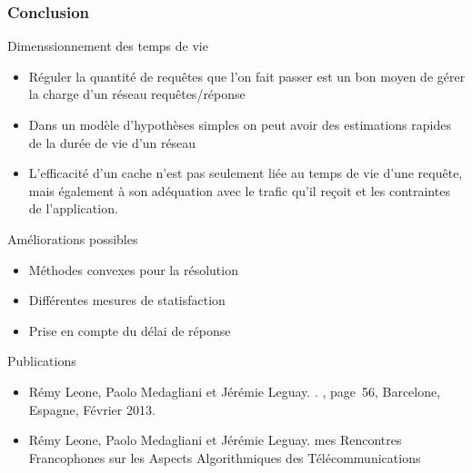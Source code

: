 \begin{frame}\frametitle{Conclusion}

  \begin{alertblock}{Dimenssionnement des temps de vie}

    \begin{itemize}

      \item Réguler la quantité de requêtes que l'on fait passer est un bon moyen de gérer la charge d'un réseau requêtes/réponse

      \item Dans un modèle d'hypothèses simples on peut avoir des estimations rapides de la durée de vie d'un réseau

      \item L'efficacité d'un cache n'est pas seulement liée au temps de vie d'une requête, mais également à son adéquation avec le trafic qu'il reçoit et les contraintes de l'application.

    \end{itemize}

  \end{alertblock}

  \begin{block}{Améliorations possibles}
    \begin{itemize}
      \item Méthodes convexes pour la résolution
      \item Différentes mesures de statisfaction
      \item Prise en compte du délai de réponse
    \end{itemize}
  \end{block}

\end{frame}

\begin{frame}{Publications}
  \begin{itemize}
    \item Rémy Leone, Paolo Medagliani et Jérémie Leguay.
      .
      , page~56, Barcelone, Espagne, Février 2013.

    \item Rémy Leone, Paolo Medagliani et Jérémie Leguay.
      mes Rencontres Francophones sur les Aspects Algorithmiques des T{\'e}l{\'e}communications

  \end{itemize}
\end{frame}
